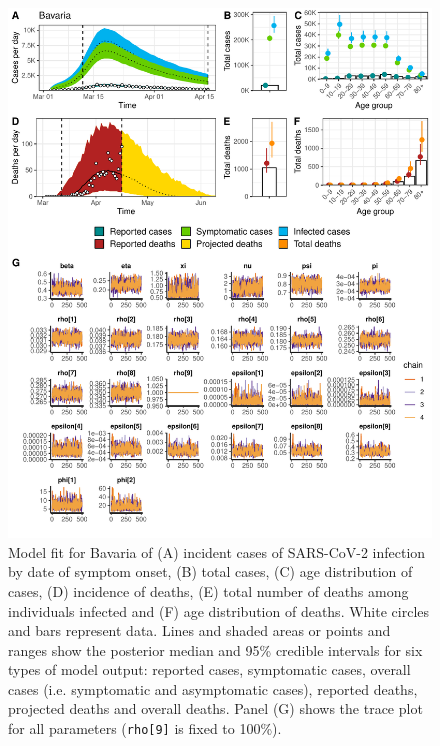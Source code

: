 \documentclass{article}
\begin{document}
\begin{figure}[h]
	\centering
	\includegraphics[width=\linewidth]{../format_output/figures_v3/supp_fit_bavaria.pdf}
	\caption{Model fit for Bavaria of (A) incident cases of SARS-CoV-2 infection by date of symptom onset, (B) total cases, (C) age distribution of cases, (D) incidence of deaths, (E) total number of deaths among individuals infected and (F) age distribution of deaths. White circles and bars represent data. Lines and shaded areas or points and ranges show the posterior median and 95\% credible intervals for six types of model output: reported cases, symptomatic cases, overall cases (i.e. symptomatic and asymptomatic cases), reported deaths, projected deaths and overall deaths. Panel (G) shows the trace plot for all parameters (\texttt{rho[9]} is fixed to 100\%).}

\end{figure}
\end{document}
